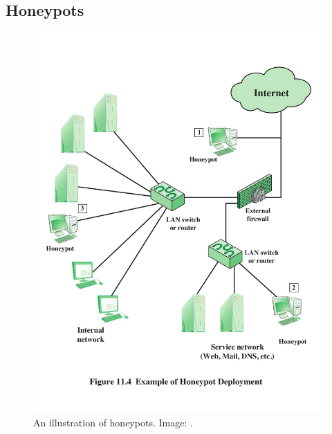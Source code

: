 \subsection{Honeypots}

\begin{frame}
  \begin{figure}
    \includegraphics[height=0.7\textheight]{honeypot.pdf}
    \caption{An illustration of honeypots.
      Image: \cite{Stallings2013nse}.}
  \end{figure}
\end{frame}


